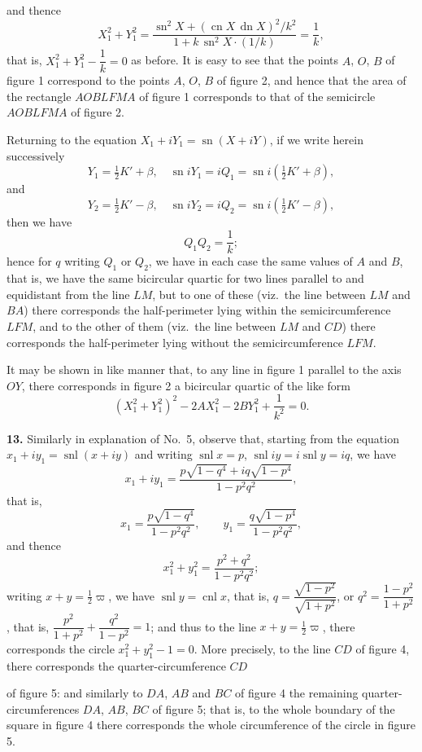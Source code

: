 \documentclass[11pt,a4paper]{article}
\providecommand{\sn}{\operatorname{sn}}
\providecommand{\cn}{\operatorname{cn}}
\providecommand{\dn}{\operatorname{dn}}
\providecommand{\snl}{\operatorname{snl}}
\providecommand{\cnl}{\operatorname{cnl}}
\begin{document}
and thence
\[
X_1^2 + Y_1^2 = \frac{\sn^2 X + (\cn X\,\dn X)^2/k^2}{1 + k\,\sn^2 X\cdot(1/k)} = \frac{1}{k},
\]
that is, $X_1^2 + Y_1^2 - \dfrac{1}{k} = 0$ as before. It is easy to see that the points $A$, $O$, $B$ of figure 1 correspond to the points $A$, $O$, $B$ of figure 2, and hence that the area of the rectangle $AOBLFMA$ of figure 1 corresponds to that of the semicircle $AOBLFMA$ of figure 2.

Returning to the equation $X_1 + i Y_1 = \sn(X + iY)$, if we write herein successively
\[
Y_1 = \tfrac{1}{2}K' + \beta, \quad \sn i Y_1 = i Q_1 = \sn i(\tfrac{1}{2}K' + \beta),
\]
and
\[
Y_2 = \tfrac{1}{2}K' - \beta, \quad \sn i Y_2 = i Q_2 = \sn i(\tfrac{1}{2}K' - \beta),
\]
then we have
\[
Q_1 Q_2 = \frac{1}{k};
\]
hence for $q$ writing $Q_1$ or $Q_2$, we have in each case the same values of $A$ and $B$, that is, we have the same bicircular quartic for two lines parallel to and equidistant from the line $LM$, but to one of these (viz.\ the line between $LM$ and $BA$) there corresponds the half-perimeter lying within the semicircumference $LFM$, and to the other of them (viz.\ the line between $LM$ and $CD$) there corresponds the half-perimeter lying without the semicircumference $LFM$.

It may be shown in like manner that, to any line in figure 1 parallel to the axis $OY$, there corresponds in figure 2 a bicircular quartic of the like form
\[
(X_1^2 + Y_1^2)^2 - 2 A X_1^2 - 2 B Y_1^2 + \frac{1}{k^2} = 0.
\]

\textbf{13.} Similarly in explanation of No.~5, observe that, starting from the equation $x_1 + i y_1 = \snl(x + iy)$ and writing $\snl x = p$, $\snl iy = i\snl y = iq$, we have
\[
x_1 + i y_1 = \frac{p\sqrt{1 - q^4} + iq\sqrt{1 - p^4}}{1 - p^2 q^2},
\]
that is,
\[
x_1 = \frac{p\sqrt{1 - q^4}}{1 - p^2 q^2}, \qquad y_1 = \frac{q\sqrt{1 - p^4}}{1 - p^2 q^2},
\]
and thence
\[
x_1^2 + y_1^2 = \frac{p^2 + q^2}{1 - p^2 q^2};
\]
writing $x + y = \tfrac{1}{2}\varpi$, we have $\snl y = \cnl x$, that is, $q = \dfrac{\sqrt{1 - p^2}}{\sqrt{1 + p^2}}$, or $q^2 = \dfrac{1 - p^2}{1 + p^2}$, that is, $\dfrac{p^2}{1 + p^2} + \dfrac{q^2}{1 - p^2} = 1$;
and thus to the line $x + y = \tfrac{1}{2}\varpi$, there corresponds the circle $x_1^2 + y_1^2 - 1 = 0$. More precisely, to the line $CD$ of figure 4, there corresponds the quarter-circumference $CD$

of figure 5: and similarly to $DA$, $AB$ and $BC$ of figure 4 the remaining quarter-circumferences $DA$, $AB$, $BC$ of figure 5; that is, to the whole boundary of the square in figure 4 there corresponds the whole circumference of the circle in figure 5.
\end{document}

